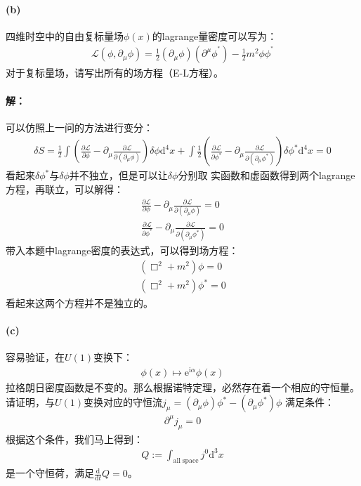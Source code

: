 \documentclass[a4paper]{ctexart}
\def\d{\mathrm{d}}
\begin{document}
    \paragraph{(b)}\;四维时空中的自由复标量场$\phi(x)$的lagrange量密度可以写为：
    \begin{align}
        \mathcal{L}(\phi, \partial_{\mu}\phi) = \frac{1}{2}(\partial_{\mu}\phi)(\partial^{\mu}\phi^{^{\ast}}) - \frac{1}{2}m^{2}\phi\phi^{^{\ast}}
    \end{align}
    对于复标量场，请写出所有的场方程（E-L方程）。
    \paragraph{解：}
    可以仿照上一问的方法进行变分：
    \begin{align}
        \delta S = \frac{1}{2}\int\left(\frac{\partial \mathcal{L}}{\partial \phi} - \partial_{\mu}\frac{\partial\mathcal{L}}{\partial(\partial_{\mu}\phi)}\right)\delta\phi \d^{4}x
        + \int\frac{1}{2}\left(\frac{\partial \mathcal{L}}{\partial \phi^{\ast}} - \partial_{\mu}\frac{\partial\mathcal{L}}{\partial(\partial_{\mu}\phi^{\ast})}\right)\delta\phi^{\ast} \d^{4}x
        = 0
    \end{align}
    看起来$\delta\phi^{\ast}$与$\delta\phi$并不独立，但是可以让$\delta\phi$分别取
    实函数和虚函数得到两个lagrange方程，再联立，可以解得：
    \begin{align}
        \frac{\partial \mathcal{L}}{\partial \phi} - \partial_{\mu}\frac{\partial\mathcal{L}}{\partial(\partial_{\mu}\phi)} = 0\\
        \frac{\partial \mathcal{L}}{\partial \phi^{\ast}} - \partial_{\mu}\frac{\partial\mathcal{L}}{\partial(\partial_{\mu}\phi^{\ast})} = 0
    \end{align}
    带入本题中lagrange密度的表达式，可以得到场方程：
    \begin{align}
        (\Box^{2} + m^{2})\phi = 0\\
        (\Box^{2} + m^{2})\phi^{\ast} = 0
    \end{align}
    看起来这两个方程并不是独立的。
    \paragraph{(c)}
    容易验证，在$U(1)$变换下：
    \begin{align}
        \phi(x) \mapsto \mathrm{e}^{\mathrm{i} \alpha}\phi(x)
    \end{align}
    拉格朗日密度函数是不变的。那么根据诺特定理，必然存在着一个相应的守恒量。
    请证明，与$U(1)$变换对应的守恒流$j_{\mu} = (\partial_{\mu}\phi)\phi^{\ast} - (\partial_{\mu}\phi^{\ast})\phi$
    满足条件：
    \begin{align}
        \partial^{\mu}j_{\mu} = 0
    \end{align}
    根据这个条件，我们马上得到：
    \begin{align}
        Q := \int_{\mathrm{all\;space}}j^{0}\d ^{3}x
    \end{align}
    是一个守恒荷，满足$\frac{\d }{\d t}Q = 0$。
\end{document}
